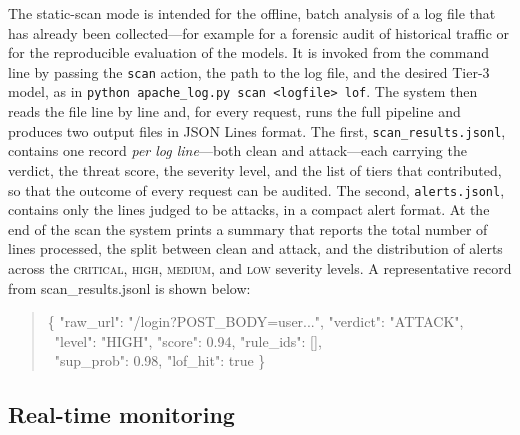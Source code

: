 \documentclass[../main.tex]{subfiles}
\begin{document}
The static-scan mode is intended for the offline, batch analysis of a log
file that has already been collected---for example for a forensic audit of
historical traffic or for the reproducible evaluation of the models. It is
invoked from the command line by passing the \texttt{scan} action, the path
to the log file, and the desired Tier-3 model, as in
\texttt{python apache\_log.py scan <logfile> lof}. The system then reads the
file line by line and, for every request, runs the full pipeline and produces
two output files in JSON Lines format. The first, \texttt{scan\_results.jsonl},
contains one record \emph{per log line}---both clean and attack---each
carrying the verdict, the threat score, the severity level, and the list of
tiers that contributed, so that the outcome of every request can be audited.
The second, \texttt{alerts.jsonl}, contains only the lines judged to be
attacks, in a compact alert format. At the end of the scan the system prints
a summary that reports the total number of lines processed, the split between
clean and attack, and the distribution of alerts across the
\textsc{critical}, \textsc{high}, \textsc{medium}, and \textsc{low} severity
levels. A representative record from scan\_results.jsonl is shown
below:

\begin{quote}\small\ttfamily
\{ "raw\_url": "/login?POST\_BODY=user...", "verdict": "ATTACK",\\
\ "level": "HIGH", "score": 0.94, "rule\_ids": [], \\
\ "sup\_prob": 0.98, "lof\_hit": true \}
\end{quote}

\subsection{Real-time monitoring}
\end{document}
